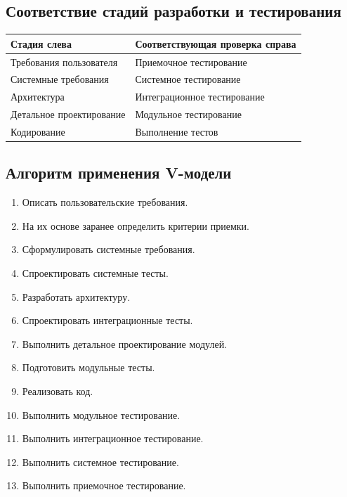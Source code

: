 \documentclass[12pt,a4paper]{article}
\begin{document}
\subsection{Соответствие стадий разработки и тестирования}

\begin{center}
\begin{tabular}{p{} p{}}
\toprule
\textbf{Стадия слева} & \textbf{Соответствующая проверка справа} \\
\midrule
Требования пользователя & Приемочное тестирование \\
Системные требования & Системное тестирование \\
Архитектура & Интеграционное тестирование \\
Детальное проектирование & Модульное тестирование \\
Кодирование & Выполнение тестов \\
\bottomrule
\end{tabular}
\end{center}

\subsection{Алгоритм применения V-модели}

\begin{enumerate}
    \item Описать пользовательские требования.
    \item На их основе заранее определить критерии приемки.
    \item Сформулировать системные требования.
    \item Спроектировать системные тесты.
    \item Разработать архитектуру.
    \item Спроектировать интеграционные тесты.
    \item Выполнить детальное проектирование модулей.
    \item Подготовить модульные тесты.
    \item Реализовать код.
    \item Выполнить модульное тестирование.
    \item Выполнить интеграционное тестирование.
    \item Выполнить системное тестирование.
    \item Выполнить приемочное тестирование.
\end{enumerate}
\end{document}
